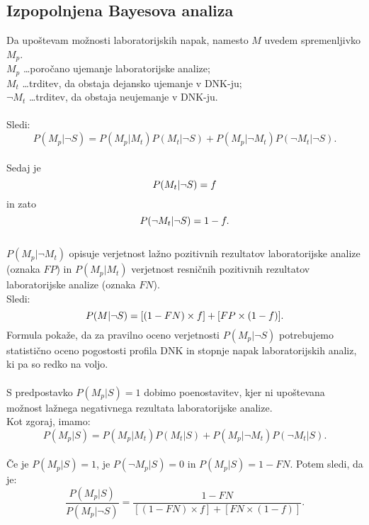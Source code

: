 \documentclass[mat1, tisk]{fmfdelo}
\theoremstyle{definition} %
\theoremstyle{trditev} %
\theoremstyle{izrek}
\begin{document}
\subsection{Izpopolnjena Bayesova analiza}
Da upoštevam možnosti laboratorijskih napak, namesto $M$ uvedem spremenljivko $M_p$.\\
$M_p$ \dots poročano ujemanje laboratorijske analize; \\
$M_t$ \dots trditev, da obstaja dejansko ujemanje v DNK-ju;\\
$\neg M_t$ \dots trditev, da obstaja neujemanje v DNK-ju.\\\\
Sledi:
\[
   P(M_p \lvert \neg S) = P(M_p \lvert M_t)P(M_t \lvert \neg S) + P(M_p \lvert \neg M_t)P(\neg M_t \lvert \neg S).
\]\\
Sedaj je 
\[
    P(M_t \lvert \neg S) = f \vspace{2mm}
\] 
in zato 
\[
    P(\neg M_t \lvert \neg S) = 1-f. \vspace{2mm}
\]\\
$P(M_p \lvert \neg M_t)$ opisuje verjetnost lažno pozitivnih rezultatov laboratorijske analize (oznaka $FP$) in $P(M_p \lvert M_t)$ verjetnost resničnih 
pozitivnih rezultatov laboratorijske analize (oznaka $FN$).\\
Sledi:
\[
   P(M \lvert \neg S) = [(1 - FN) \times f] + [FP \times (1 - f)]. \vspace{2mm}
\]
Formula pokaže, da za pravilno oceno verjetnosti $P(M_p \lvert \neg S)$ potrebujemo statistično oceno pogostosti profila DNK in stopnje napak
laboratorijskih analiz, ki pa so redko na voljo.\\\\
S predpostavko $P(M_p \lvert S) = 1$ dobimo poenostavitev, kjer ni upoštevana možnost lažnega negativnega rezultata laboratorijske analize. \\
Kot zgoraj, imamo:
\[
   P(M_p \lvert S) = P(M_p \lvert M_t)P(M_t \lvert S) + P(M_p \lvert \neg M_t)P(\neg M_t \lvert S).
\]\\
Če je $P(M_p \lvert S) = 1$, je $P(\neg M_p \lvert S) = 0$ in $P(M_p \lvert S) = 1 - FN$. Potem sledi, da je:
\[
   \frac{P(M_p \lvert S)}{P(M_p \lvert \neg S)} = \frac{1 - FN}{[(1 - FN) \times f] + [FN \times (1 - f)]}. 
\]\\\\
\end{document}
